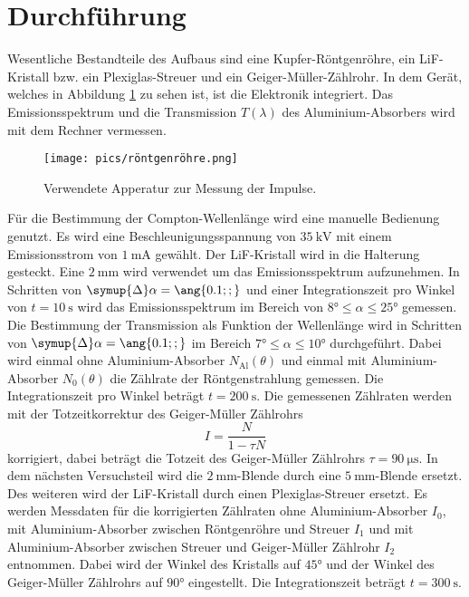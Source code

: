 \section{Durchführung}
\label{sec:Durchführung}
Wesentliche Bestandteile des Aufbaus sind eine Kupfer-Röntgenröhre, ein LiF-Kristall bzw. ein Plexiglas-Streuer und ein Geiger-Müller-Zählrohr.
In dem Gerät, welches in Abbildung \ref{fig:rön} zu sehen ist, ist die Elektronik integriert. Das Emissionsspektrum und die Transmission $T(\lambda)$ des Aluminium-Absorbers wird mit dem Rechner vermessen.
\begin{figure}
    \centering
    \caption{Verwendete Apperatur zur Messung der Impulse.\cite{v603}}
    \label{fig:rön}
    \texttt{[image: pics/röntgenröhre.png]}
\end{figure}
Für die Bestimmung der Compton-Wellenlänge wird eine manuelle Bedienung genutzt. Es wird eine Beschleunigungsspannung von $\SI{35}{\kilo \volt}$ mit einem Emissionsstrom von $\SI{1}{\milli \ampere}$ gewählt.
Der LiF-Kristall wird in die Halterung gesteckt. Eine $\SI{2}{\milli \metre}$ wird verwendet um das Emissionsspektrum aufzunehmen. In Schritten von $\symup{\Delta}\alpha=\ang{0.1;;}$ und einer Integrationszeit pro Winkel von $t=\SI{10}{\second}$
wird das Emissionsspektrum im Bereich von $\ang{8;;} \leq \alpha \leq \ang{25;;}$ gemessen. 
\\
Die Bestimmung der Transmission als Funktion der Wellenlänge wird in Schritten von $\symup{\Delta}\alpha=\ang{0.1;;}$ im Bereich $\ang{7;;} \leq \alpha \leq \ang{10;;}$ durchgeführt.
Dabei wird einmal ohne Aluminium-Absorber $N_\text{Al}(\theta)$ und einmal mit Aluminium-Absorber $N_0(\theta)$ die Zählrate der Röntgenstrahlung gemessen. Die Integrationszeit pro Winkel beträgt
$t=\SI{200}{\second}$. Die gemessenen Zählraten werden mit der Totzeitkorrektur des Geiger-Müller Zählrohrs
\begin{equation}
    I=\frac{N}{1-\tau N}
    \label{eqn:tot}
\end{equation}
korrigiert, dabei beträgt die Totzeit des Geiger-Müller Zählrohrs $\tau=\SI{90}{\micro \second}$.
In dem nächsten Versuchsteil wird die $\SI{2}{\milli \metre}$-Blende durch eine $\SI{5}{\milli \metre}$-Blende ersetzt. Des weiteren wird der LiF-Kristall
durch einen Plexiglas-Streuer ersetzt. Es werden Messdaten für die korrigierten Zählraten ohne Aluminium-Absorber $I_0$, mit Aluminium-Absorber zwischen Röntgenröhre und Streuer $I_1$ und mit Aluminium-Absorber zwischen Streuer und Geiger-Müller Zählrohr $I_2$ entnommen.
Dabei wird der Winkel des Kristalls auf $\ang{45;;}$ und der Winkel des Geiger-Müller Zählrohrs auf $\ang{90;;}$ eingestellt. Die Integrationszeit beträgt $t=\SI{300}{\second}$.